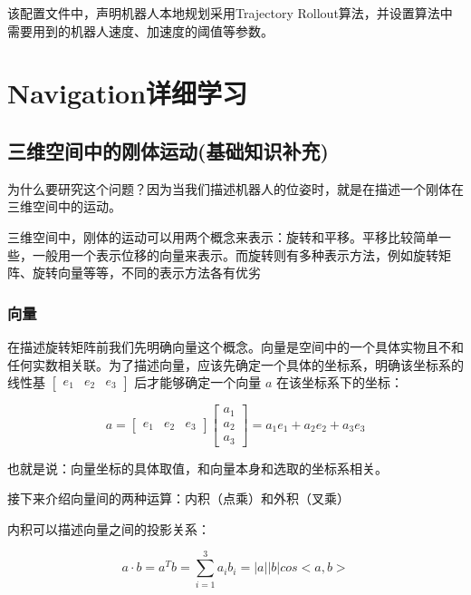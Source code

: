 \documentclass[10pt, oneside]{book}
\begin{document}
该配置文件中，声明机器人本地规划采用Trajectory Rollout算法，并设置算法中需要用到的机器人速度、加速度的阈值等参数。

\chapter{Navigation详细学习}

\section{三维空间中的刚体运动(基础知识补充)}

为什么要研究这个问题？因为当我们描述机器人的位姿时，就是在描述一个刚体在三维空间中的运动。

三维空间中，刚体的运动可以用两个概念来表示：旋转和平移。平移比较简单一些，一般用一个表示位移的向量来表示。而旋转则有多种表示方法，例如旋转矩阵、旋转向量等等，不同的表示方法各有优劣

\subsection{向量}

在描述旋转矩阵前我们先明确向量这个概念。向量是空间中的一个具体实物且不和任何实数相关联。为了描述向量，应该先确定一个具体的坐标系，明确该坐标系的线性基 $\begin{bmatrix} e_1 & e_2 & e_3 \end{bmatrix}$ 后才能够确定一个向量 $a$ 在该坐标系下的坐标：

\begin{equation}
    a = 
    \begin{bmatrix}
      e_1 & e_2 & e_3
    \end{bmatrix}
    \begin{bmatrix}
     a_1\\
     a_2\\
     a_3
    \end{bmatrix}
    = a_1e_1+a_2e_2+a_3e_3
\end{equation}

也就是说：向量坐标的具体取值，和向量本身和选取的坐标系相关。

接下来介绍向量间的两种运算：内积（点乘）和外积（叉乘）

内积可以描述向量之间的投影关系：

\begin{equation}
    a \cdot b = a^Tb = \sum_{i=1}^3 a_ib_i = |a||b|cos<a,b>
\end{equation}
\end{document}
